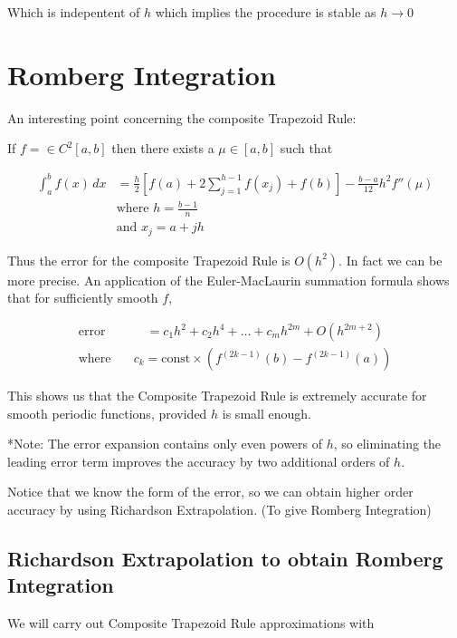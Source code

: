 Which is indepentent of $h$ which implies the procedure is stable as $h\to 0$

\section{Romberg Integration}
\label{sec:romberg_integration}
An interesting point concerning the composite Trapezoid Rule:

If $f= \in C^2[a,b]$ then there exists a $\mu \in [a,b]$ such that 

\begin{align*}
  \int_{a}^{b} f(x) \, dx &= \frac{h}{2} \left[
    f(a) + 2 \sum_{j=1}^{h-1} f(x_j) + f(b)
  \right] - \frac{b-a}{12}h^2 f''(\mu) \\
                          &\text{where } h = \frac{b-1}{n} \\
                          &\text{and } x_j = a + jh
\end{align*}

Thus the error for the composite Trapezoid Rule is $O(h^2)$. In fact we can be
more precise. An application of the Euler-MacLaurin summation formula shows that
for sufficiently smooth $f$,

\begin{align*}
  \text{error} \quad&\quad= c_1 h^2 + c_2 h^4 + \dots + c_m h^{2m} + O(h^{2m+2}) \\
  \text{where}\quad &c_k = \text{const} \times \left(
    f^{(2k-1)}(b) - f^{(2k-1)}(a)
  \right)
\end{align*}

This shows us that the Composite Trapezoid Rule is extremely accurate for smooth
periodic functions, provided $h$ is small enough.

*Note: The error expansion contains only even powers of $h$, so eliminating the 
leading error term improves the accuracy by two additional orders of $h$.

Notice that we know the form of the error, so we can obtain higher order
accuracy by using Richardson Extrapolation. (To give Romberg Integration)

\subsection{Richardson Extrapolation to obtain Romberg Integration}
\label{sec:richardson_extrapolation_to_obtain_romberg_integration}

We will carry out Composite Trapezoid Rule approximations with 

